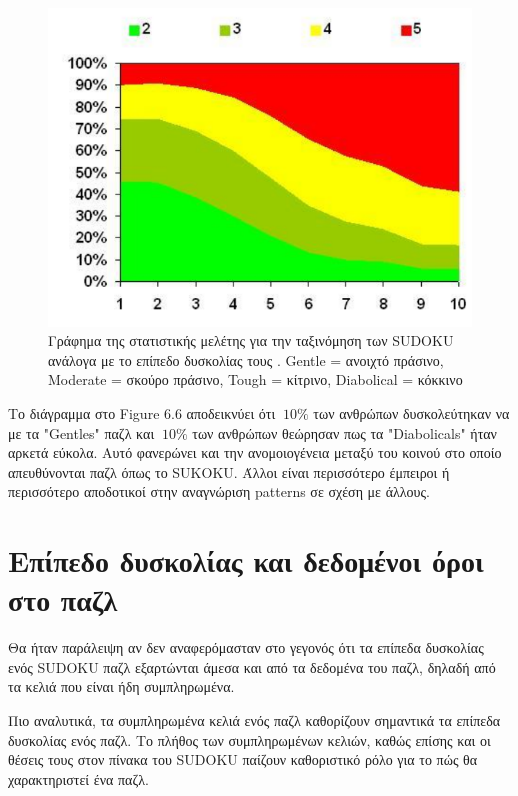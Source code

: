 \documentclass[12pt]{book}
\theoremstyle{definition}
\begin{document}
\begin{figure}[h]
	\centering	
	\includegraphics[scale=0.55]{Figures/stat3.png}
	\caption{Γράφημα της στατιστικής μελέτης για την ταξινόμηση των SUDOKU ανάλογα με το επίπεδο δυσκολίας τους . Gentle = ανοιχτό πράσινο, Moderate = σκούρο πράσινο, Tough = κίτρινο, Diabolical = κόκκινο}
\end{figure} 

Το διάγραμμα στο Figure 6.6 αποδεικνύει ότι \(~10\%\) των ανθρώπων δυσκολεύτηκαν να με τα "Gentles" παζλ και \(~10\%\) των ανθρώπων θεώρησαν πως τα "Diabolicals" ήταν αρκετά εύκολα. Αυτό φανερώνει και την ανομοιογένεια μεταξύ του κοινού στο οποίο απευθύνονται παζλ όπως το SUKOKU. Άλλοι είναι περισσότερο έμπειροι ή περισσότερο αποδοτικοί στην αναγνώριση patterns σε σχέση με άλλους.  

\section{Επίπεδο δυσκολίας και δεδομένοι όροι στο παζλ}

Θα ήταν παράλειψη αν δεν αναφερόμασταν στο γεγονός ότι τα επίπεδα δυσκολίας ενός SUDOKU παζλ εξαρτώνται άμεσα και από τα δεδομένα του παζλ, δηλαδή από τα κελιά που είναι ήδη συμπληρωμένα. \par
 
Πιο αναλυτικά, τα συμπληρωμένα κελιά ενός παζλ καθορίζουν σημαντικά τα επίπεδα δυσκολίας ενός παζλ. Το πλήθος των συμπληρωμένων κελιών, καθώς επίσης και οι θέσεις τους στον πίνακα του SUDOKU παίζουν καθοριστικό ρόλο για το πώς θα χαρακτηριστεί ένα παζλ. \par
 
\end{document}
